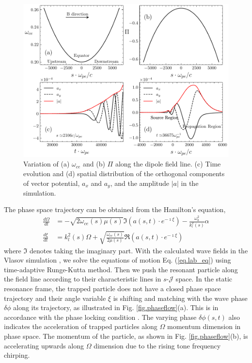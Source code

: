 \begin{figure}
    \centering
    \includegraphics[scale=0.5]{img/aanda.pdf}
    \caption{Variation of (a) $\omega_{ce}$ and (b) $\Pi$ along the dipole field line.  (c) Time evolution and (d) spatial distribution of the orthogonal components of vector potential, $a_x$ and $a_y$, and the amplitude $|a|$ in the simulation.
    \label{fig.aanda}
    }
\end{figure}

The phase space trajectory can be obtained from the Hamilton's  equation,
\begin{equation}\label{eq.lab_eq}
    \begin{aligned}
        \frac{d\Omega}{dt} &= - \sqrt{2\omega_{ce}(s)\mu(s)} {\Im} (a(s,t)\cdot e^{-\imath \xi}) - \frac{\omega^2_{b}}{k_l^2(s)} \alpha
        \\
        \frac{d\xi}{dt} &= k_l^2(s) \Omega +\sqrt{\frac{\omega_{ce}(s)}{2\mu(s)}} {\Re}(a(s,t)\cdot e^{-\imath \xi})
    \end{aligned}
\end{equation}
where $\Im$ denotes taking the imaginary part.
With the calculated wave fields  in the Vlasov simulation \cite{zheng2024}, we solve the  equations of motion Eq. (\ref{eq.lab_eq}) using time-adaptive Runge-Kutta method. 
Then we push the resonant particle along the field line according to their characteristic lines in $s$-$\mathcal{J}$ space.
In the static resonance frame, the trapped particle does not have a closed phase space trajectory and their angle variable $\xi$ is shifting and matching with the wave phase $\delta \phi$ along its trajectory, as illustrated in Fig. \ref{fig.phaseflow}(a). This is in accordance with the phase locking condition \cite{tao_trap-release-amplify_2021}.
The varying phase $\delta \phi(s,t)$ also indicates the acceleration of trapped particles along $\Omega$ momentum dimension in phase space.
The momentum of the particle, as shown in Fig. \ref{fig.phaseflow}(b), is accelerating upwards along $\Omega$ dimension due to the rising tone frequency chirping.

